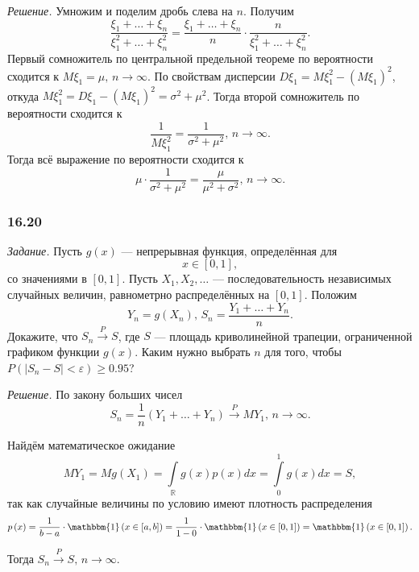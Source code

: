 \textit{Решение.} Умножим и поделим дробь слева на $n$.
Получим
$$ \frac{ \xi_1 + \dotsc + \xi_n}{ \xi_1^2 + \dotsc + \xi_n^2} =
  \frac{ \xi_1 + \dotsc + \xi_n}{n} \cdot \frac{n}{ \xi_1^2 + \dotsc + \xi_n^2}.$$
Первый сомножитель по центральной предельной теореме по вероятности сходится к
$M \xi_1 = \mu, \,
  n \to \infty $.
По свойствам дисперсии $D \xi_1 = M \xi_1^2 - \left( M \xi_1 \right)^2$,
откуда $M \xi_1^2 = D \xi_1 - \left( M \xi_1 \right)^2 = \sigma^2 + \mu^2$.
Тогда второй сомножитель по вероятности сходится к
$$ \frac{1}{M \xi_1^2} =
  \frac{1}{ \sigma^2 + \mu^2}, \,
  n \to \infty.$$
Тогда всё выражение по вероятности сходится к
$$ \mu \cdot \frac{1}{ \sigma^2 + \mu^2} =
  \frac{ \mu }{ \mu^2 + \sigma^2}, \,
  n \to \infty.$$

\subsubsection*{16.20}

\textit{Задание.}
Пусть $g \left( x \right) $ --- непрерывная функция, определённая для
$$x \in
  \left[ 0, 1 \right],$$
со значениями в $ \left[ 0, 1 \right]$.
Пусть $X_1, X_2, \dotsc $ --- последовательность независимых случайных величин,
равнометрно распределённых на $ \left[ 0, 1 \right]$.
Положим
$$Y_n = g \left( X_n \right), \,
  S_n = \frac{Y_1 + \dotsc + Y_n}{n}.$$
Докажите, что $S_n \overset{P}{ \rightarrow } S$, где $S$ --- площадь криволинейной трапеции,
ограниченной графиком функции $g \left( x \right)$.
Каким нужно выбрать $n$ для того,
чтобы $P \left( \left| S_n - S \right| < \varepsilon \right) \geq 0.95$?

\textit{Решение.} По закону больших чисел
$$S_n =
  \frac{1}{n} \left( Y_1 + \dotsc + Y_n \right) \overset{P}{ \rightarrow } MY_1, \,
  n \to \infty.$$

Найдём математическое ожидание
$$MY_1 =
  Mg \left( X_1 \right) =
  \int \limits_{ \mathbb{R}} g \left( x \right) p \left( x \right) dx =
  \int \limits_0^1 g \left( x \right) dx =
  S,$$
так как случайные величины по условию имеют плотность распределения
$$p \left( x \right) =
  \frac{1}{b - a} \cdot \mathbbm{1} \left( x \in \left[ a, b \right] \right) =
  \frac{1}{1 - 0} \cdot \mathbbm{1} \left( x \in \left[ 0, 1 \right] \right) =
  \mathbbm{1} \left( x \in \left[ 0, 1 \right] \right).$$

Тогда $S_n \overset{P}{ \rightarrow } S, \, n \to \infty $.

